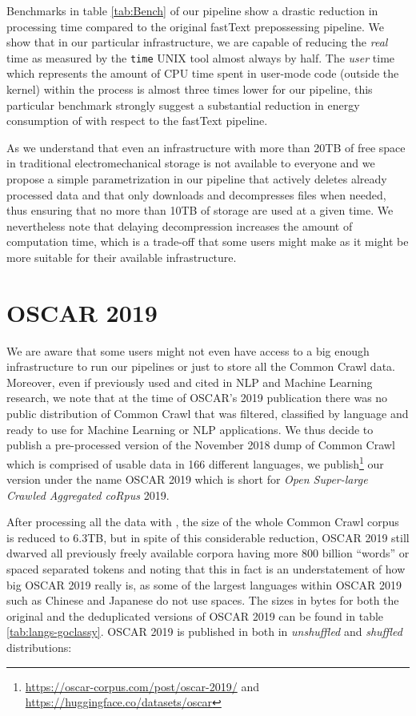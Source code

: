 Benchmarks in table \ref{tab:Bench} of our \goclassy pipeline show a drastic reduction in processing time compared to the original fastText prepossessing pipeline. We show that in our particular infrastructure, we are capable of reducing the \emph{real} time as measured by the \texttt{time} UNIX tool almost always by half. The \emph{user} time which represents the amount of CPU time spent in user-mode code (outside the kernel) within the process is almost three times lower for our \goclassy pipeline, this particular benchmark strongly suggest a substantial reduction in energy consumption of \goclassy with respect to the fastText pipeline.

As we understand that even an infrastructure with more than 20TB of free space in traditional electromechanical storage is not available to everyone and we propose a simple parametrization in our pipeline that actively deletes already processed data and that only downloads and decompresses files when needed, thus ensuring that no more than 10TB of storage are used at a given time. We nevertheless note that delaying decompression increases the amount of computation time, which is a trade-off that some users might make as it might be more suitable for their available infrastructure.

\section{OSCAR 2019}

We are aware that some users might not even have access to a big enough infrastructure to run our pipelines or just to store all the Common Crawl data. Moreover, even if previously used and cited in NLP and Machine Learning research, we note that at the time of OSCAR's 2019 publication there was no public distribution of Common Crawl that was filtered, classified by language and ready to use for Machine Learning or NLP applications. We thus decide to publish a pre-processed version of the November 2018 dump of Common Crawl which is comprised of usable data in 166 different languages, we publish\footnote{\url{https://oscar-corpus.com/post/oscar-2019/} and \url{https://huggingface.co/datasets/oscar}} our version under the name OSCAR 2019 which is short for \emph{Open Super-large Crawled Aggregated coRpus} 2019.

After processing all the data with \goclassy, the size of the whole Common Crawl corpus is reduced to 6.3TB, but in spite of this considerable reduction, OSCAR 2019 still dwarved all previously freely available corpora having more 800 billion ``words'' or spaced separated tokens and noting that this in fact is an understatement of how big OSCAR 2019 really is, as some of the largest languages within OSCAR 2019 such as Chinese and Japanese do not use spaces. The sizes in bytes for both the original and the deduplicated versions of OSCAR 2019 can be found in table \ref{tab:langs-goclassy}. OSCAR 2019 is published in both in \emph{unshuffled} and \emph{shuffled} distributions:

